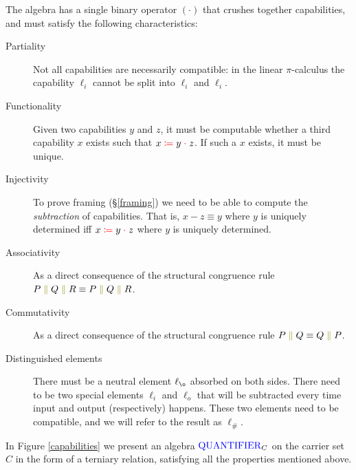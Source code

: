 \documentclass[a4paper,UKenglish,cleveref, autoref, thm-restate,authorcolumns]{lipics-v2019}
\newcommand{\picalc}{$\pi$-calculus}
\newcommand{\type}[1]{\textcolor{blue}{\mathtt{\operatorname{#1}}}}
\newcommand{\constr}[1]{\textcolor{olive}{\mathtt{\operatorname{#1}}}}
\newcommand{\field}[1]{\textcolor{red}{\mathtt{\operatorname{#1}}}}
\newcommand{\comp}[2]{#1 \; \constr{\parallel} \; #2}
\newcommand{\op}[3]{#1 \; \field{\coloneqq} \; #2 \; \field{\cdot} \; #3}
\newcommand{\Quantifier}{\type{QUANTIFIER}}
\begin{document}
The algebra has a single binary operator $(\cdot)$ that crushes together capabilities, and must satisfy the following characteristics:
\begin{description}

\item [Partiality]
  Not all capabilities are necessarily compatible: in the linear \picalc{} the capability $\ell_i$ cannot be split into $\ell_i$ and $\ell_i$.
\item [Functionality]
  Given two capabilities $y$ and $z$, it must be computable whether a third capability $x$ exists such that $\op{x}{y}{z}$.
  If such a $x$ exists, it must be unique.
    
\item [Injectivity]
  To prove framing (\S \ref{framing}) we need to be able to compute the \emph{subtraction} of capabilities.
  That is, $x - z \equiv y$ where $y$ is uniquely determined iff $\op{x}{y}{z}$ where $y$ is uniquely determined.

\item [Associativity]
  As a direct consequence of the structural congruence rule $\comp{P}{\comp{Q}{R}} \equiv \comp{\comp{P}{Q}}{R}$.

\item [Commutativity]
  As a direct consequence of the structural congruence rule $\comp{P}{Q} \equiv \comp{Q}{P}$.

\item [Distinguished elements]
  There must be a neutral element $\ell_{\o}$ absorbed on both sides.
  There need to be two special elements $\ell_i$ and $\ell_o$ that will be subtracted every time input and output (respectively) happens.
  These two elements need to be compatible, and we will refer to the result as $\ell_\#$.
\end{description}
  
In Figure \ref{capabilities} we present an algebra $\Quantifier_C$ on the carrier set $C$ in the form of a terniary relation, satisfying all the properties mentioned above.
\end{document}
